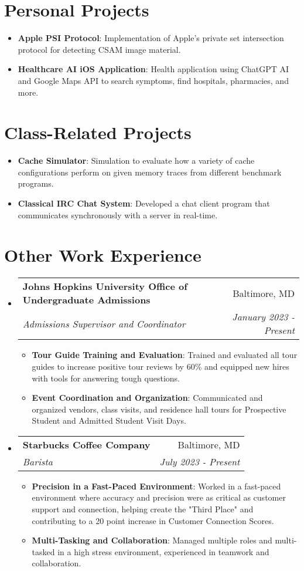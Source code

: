 \documentclass[letterpaper,11pt]{article}
\makeatletter
\newcommand{\resumeItem}[2]{
  \item\small{
    \textbf{#1}{: #2 \vspace{-2pt}}
  }
}
\newcommand{\resumeSubheading}[4]{
  \vspace{-1pt}\item
    \begin{tabular*}{0.97\textwidth}[t]{l@{\extracolsep{\fill}}r}
      \textbf{#1} & #2 \\
      \textit{\small#3} & \textit{\small #4} \\
    \end{tabular*}\vspace{-5pt}
}
\newcommand{\resumeSubItem}[2]{\resumeItem{#1}{#2}\vspace{-4pt}}
\newcommand{\resumeSubHeadingListStart}{\begin{itemize}[leftmargin=*]}
\newcommand{\resumeSubHeadingListEnd}{\end{itemize}}
\newcommand{\resumeItemListStart}{\begin{itemize}}
\newcommand{\resumeItemListEnd}{\end{itemize}\vspace{-5pt}}
\makeatother
\begin{document}
\section{Personal Projects}
  \resumeSubHeadingListStart
    \resumeSubItem{Apple PSI Protocol}
      {Implementation of Apple's private set intersection protocol for detecting CSAM image material.}
    \resumeSubItem{Healthcare AI iOS Application}
      {Health application using ChatGPT AI and Google Maps API to search symptoms, find hospitals, pharmacies, and more.}
  \resumeSubHeadingListEnd

\section{Class-Related Projects}
  \resumeSubHeadingListStart
    \resumeSubItem{Cache Simulator}
      {Simulation to evaluate how a variety of cache configurations perform on given memory traces from different benchmark programs.}
    \resumeSubItem{Classical IRC Chat System}
      {Developed a chat client program that communicates synchronously with a server in real-time.}
  \resumeSubHeadingListEnd

\section{Other Work Experience}
  \resumeSubHeadingListStart

    \resumeSubheading
      {Johns Hopkins University Office of Undergraduate Admissions}{Baltimore, MD}
      {Admissions Supervisor and Coordinator}{January 2023 - Present}
      \resumeItemListStart
        \resumeItem{Tour Guide Training and Evaluation}
          {Trained and evaluated all tour guides to increase positive tour reviews by 60\% and equipped new hires with tools for answering tough questions.}
        \resumeItem{Event Coordination and Organization}
          {Communicated and organized vendors, class visits, and residence hall tours for Prospective Student and Admitted Student Visit Days.}      
      \resumeItemListEnd

    \resumeSubheading
      {Starbucks Coffee Company}{Baltimore, MD}
      {Barista}{July 2023 - Present}
      \resumeItemListStart
        \resumeItem{Precision in a Fast-Paced Environment}
          {Worked in a fast-paced environment where accuracy and precision were as critical as customer support and connection, helping create the "Third Place" and contributing to a 20 point increase in Customer Connection Scores.}
        \resumeItem{Multi-Tasking and Collaboration}
          {Managed multiple roles and multi-tasked in a high stress environment, experienced in teamwork and collaboration.}
      \resumeItemListEnd
    \resumeSubHeadingListEnd
  
\end{document}
